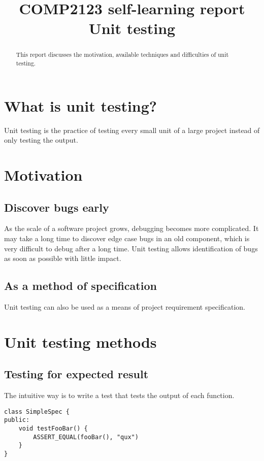 \documentclass{article}
\title{COMP2123 self-learning report \\
Unit testing}
\begin{document}

\maketitle
\begin{abstract}
This report discusses the motivation, available techniques and difficulties of unit testing.
\end{abstract}
\newpage

{\hypersetup{hidelinks}
	\tableofcontents
}
\newpage

\section{What is unit testing?}
Unit testing is the practice of testing every small unit of a large project instead of only testing the output.

\section{Motivation}
\subsection{Discover bugs early}
As the scale of a software project grows, debugging becomes more complicated.
It may take a long time to discover edge case bugs in an old component, which is very difficult to debug after a long time.
Unit testing allows identification of bugs as soon as possible with little impact.

\subsection{As a method of specification}
Unit testing can also be used as a means of project requirement specification.

\section{Unit testing methods}
\subsection{Testing for expected result}
The intuitive way is to write a test that tests the output of each function.

\begin{lstlisting}[style=Cpp]
class SimpleSpec {
public:
	void testFooBar() {
		ASSERT_EQUAL(fooBar(), "qux")
	}
}
\end{lstlisting}
\end{document}
